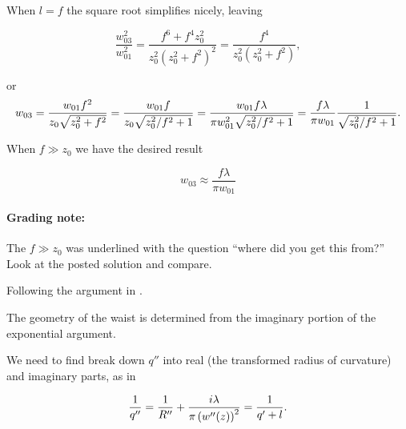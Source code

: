 {When $l = f$ the square root simplifies nicely, leaving

\begin{dmath}\label{eqn:problemSet4Problem1:260}
\frac{w_{03}^2}{w_{01}^2}
= \frac{
f^6 + f^4 z_0^2
}{z_0^2 \left(z_0^2 + f^2\right)^2 }
=
\frac{f^4}{z_0^2\left(z_0^2 + f^2\right) },
\end{dmath}

or
\begin{dmath}\label{eqn:problemSet4Problem1:280}
w_{03}
=
\frac{w_{01} f^2}{z_0 \sqrt{z_0^2 + f^2} }
=
\frac{w_{01} f}{z_0 \sqrt{z_0^2/f^2 + 1} }
=
\frac{w_{01} f \lambda}{\pi w_{01}^2 \sqrt{z_0^2/f^2 + 1} }
=
\frac{f \lambda}{\pi w_{01}} \inv{\sqrt{z_0^2/f^2 + 1} }.
\end{dmath}

When $f \gg z_0$ we have the desired result

\begin{dmath}\label{eqn:problemSet4Problem1:300}
\boxed{
w_{03}
\approx
\frac{f \lambda}{\pi w_{01}}
}
\end{dmath}

\paragraph{Grading note:} The $f \gg z_0$ was underlined with the question ``where did you get this from?''  Look at the posted solution and compare.


Following the argument in \citep{yariv1989quantum}.

The geometry of the waist is determined from the imaginary portion of the exponential argument.
%
%

We need to find break down $q''$ into real (the transformed radius of curvature) and imaginary parts, as in

\begin{equation}\label{eqn:problemSet4Problem1:340}
\frac{1}{q''} = \frac{1}{R''} + \frac{i \lambda}{\pi \left(w''(z) \right)^2 }
=
\frac{1}{q' + l}.
\end{equation}

}
